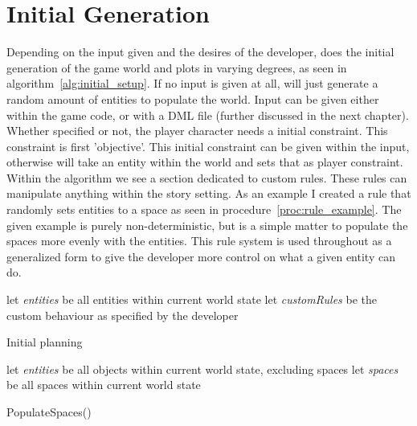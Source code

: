 \section{Initial Generation}
Depending on the input given and the desires of the developer, \diage does the initial generation of the game world and plots in varying degrees, as seen in algorithm~\ref{alg:initial_setup}.
If no input is given at all, \diage will just generate a random amount of entities to populate the world.
Input can be given either within the game code, or with a DML file (further discussed in the next chapter).
Whether specified or not, the player character needs a initial constraint.
This constraint is \his first 'objective'.
This initial constraint can be given within the input, otherwise \diage will take an entity within the world and sets that as player constraint.
Within the algorithm we see a section dedicated to custom rules.
These rules can manipulate anything within the story setting.
As an example I created a rule that randomly sets entities to a space as seen in procedure~\ref{proc:rule_example}.
The given example is purely non-deterministic, but is a simple matter to populate the spaces more evenly with the entities.
This rule system is used throughout \diage as a generalized form to give the developer more control on what a given entity can do.
\begin{algorithm}
	let \textit{entities} be all entities within current world state\;
	let \textit{customRules} be the custom behaviour as specified by the developer\;
    \caption{Initial planning}\label{alg:initial_setup}
\end{algorithm}
\begin{procedure}
	let \textit{entities} be all objects within current world state, excluding spaces\;
	let \textit{spaces} be all spaces within current world state\;
	\caption{PopulateSpaces()}\label{proc:rule_example}
\end{procedure}
